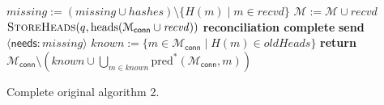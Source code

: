 \documentclass[a4paper,anonymous,USenglish]{lipics-v2019}
\begin{document}
\begin{algorithm}[p]
\begin{algorithmic}[1]
    \EndOn\label{line:end-needs2}
    \State
        \State $\mathit{missing} := (\mathit{missing} \cup \mathit{hashes}) \setminus \{H(m) \mid m \in \mathit{recvd}\}$
         \label{line:missing-empty2}
            \State $\mathcal{M} := \mathcal{M} \cup \mathit{recvd}$ \label{line:update-m2}
            \State $\textsc{StoreHeads}(q, \mathrm{heads}(\mathcal{M}_\mathsf{conn} \cup \mathit{recvd}))$
            \State \textbf{reconciliation complete} \label{line:finish2}
        \Else
            \State \textbf{send} $\langle\mathsf{needs}: \mathit{missing}\rangle$ \label{line:send-missing2}
        \EndIf
    \EndFunction
    \State
        \State $\mathit{known} := \{m \in \mathcal{M}_\mathsf{conn} \mid H(m) \in \mathit{oldHeads}\}$
        \State \textbf{return} $\mathcal{M}_\mathsf{conn} \setminus \left(\mathit{known} \cup \bigcup_{m \in \mathit{known}} \mathrm{pred}^*(\mathcal{M}_\mathsf{conn}, m)\right)$
    \EndFunction
    \end{algorithmic}
    \caption{Complete original algorithm 2.}
\end{algorithm}
\end{document}
